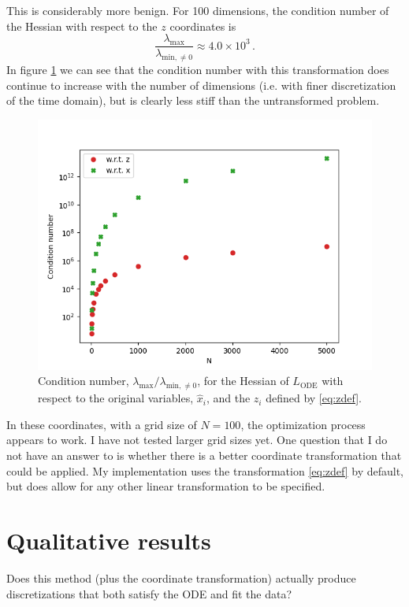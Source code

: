 \documentclass{article}
\begin{document}
This is considerably more benign. For 100 dimensions, the condition number of the Hessian with respect to the $z$ coordinates is
$$
\frac{\lambda_{\mathrm{max}}}{\lambda_{\mathrm{min}, \ne 0}} \approx 4.0 \times 10^3 \,.
$$
In figure \ref{fig:condition_numbers} we can see that the condition number with this transformation does continue to increase with the number of dimensions (i.e. with finer discretization of the time domain), but is clearly less stiff than the untransformed problem.

\begin{figure}
\includegraphics{images/method/condition_numbers.png}
\centering
\caption{
Condition number, $\lambda_{\mathrm{max}} / \lambda_{\mathrm{min}, \ne 0}$, for the Hessian of $L_{\mathrm{ODE}}$ with respect to the original variables, $\hat{x}_i$, and the $z_i$ defined by \eqref{eq:zdef}.
}
\label{fig:condition_numbers}
\end{figure}

In these coordinates, with a grid size of $N=100$, the optimization process appears to work.
I have not tested larger grid sizes yet.
One question that I do not have an answer to is whether there is a better coordinate transformation that could be applied.
My implementation uses the transformation \eqref{eq:zdef} by default, but does allow for any other linear transformation to be specified.

\section{Qualitative results}

Does this method (plus the coordinate transformation) actually produce discretizations that both satisfy the ODE and fit the data?
\end{document}
